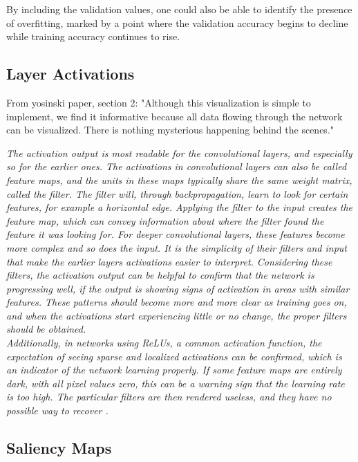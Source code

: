 By including the validation values, one could also be able to identify the presence of overfitting, marked by a point where the validation accuracy begins to decline while training accuracy continues to rise.

\subsection{Layer Activations}

From yosinski paper, section 2: "Although this visualization is simple to implement, we find
it informative because all data flowing through the network can be visualized. There is nothing mysterious happening behind the scenes."

\textit{The activation output is most readable for the convolutional layers, and especially so for the earlier ones. The activations in convolutional layers can also be called feature maps, and the units in these maps typically share the same weight matrix, called the filter. The filter will, through backpropagation, learn to look for certain features, for example a horizontal edge. Applying the filter to the input creates the feature map, which can convey information about where the filter found the feature it was looking for. For deeper convolutional layers, these features become more complex and so does the input. It is the simplicity of their filters and input that make the earlier layers activations easier to interpret. Considering these filters, the activation output can be helpful to confirm that the network is progressing well, if the output is showing signs of activation in areas with similar features. These patterns should become more and more clear as training goes on, and when the activations start experiencing little or no change, the proper filters should be obtained.} \\

\noindent \textit{Additionally, in networks using ReLUs, a common activation function, the expectation of seeing sparse and localized activations can be confirmed, which is an indicator of the network learning properly. If some feature maps are entirely dark, with all pixel values zero, this can be a warning sign that the learning rate is too high. The particular filters are then rendered useless, and they have no possible way to recover \cite{cs231n_act}. }

\subsection{Saliency Maps}

